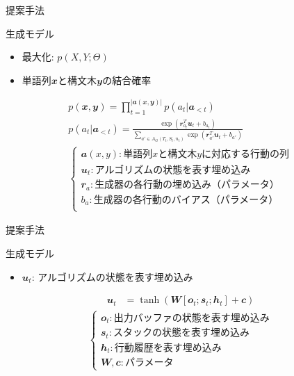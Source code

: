 \documentclass[aspectratio=43,unicode,10pt]{beamer}
\newcommand{\mb}{\mathbfit}
\begin{document}
\begin{frame}{提案手法}
  \begin{block}{生成モデル}
    \begin{itemize}
      \item 最大化: $p(X, Y; \Theta)$
      \item 単語列$\mb{x}$と構文木$\mb{y}$の結合確率
    \end{itemize}
    \begin{gather*}
      p(\mb{x}, \mb{y}) = \prod_{t=1}^{|\mb{a}(\mb{x}, \mb{y})|}
                          p(a_t | \mb{a}_{<t}) \\
      p(a_t | \mb{a}_{<t})
      = \frac{\exp (\mb{r}_{a_t}^T \mb{u}_t + b_{a_t})}
        {\sum_{a' \in A_G(T_t, S_t, n_t)}
         \exp (\mb{r}_{a'}^T \mb{u}_t + b_{a'})} \\
      \begin{cases}
        \mb{a}(x, y): \text{単語列$x$と構文木$y$に対応する行動の列} \\
        \mb{u}_t: \text{アルゴリズムの状態を表す埋め込み} \\
        \mb{r}_a: \text{生成器の各行動の埋め込み（パラメータ）} \\
        b_a: \text{生成器の各行動のバイアス（パラメータ）} \\
      \end{cases}
    \end{gather*}
  \end{block}
\end{frame}

\begin{frame}{提案手法}
  \begin{block}{生成モデル}
    \begin{itemize}
      \item $\mb{u}_t$: アルゴリズムの状態を表す埋め込み
    \end{itemize}
    \begin{align*}
      \mb{u}_t & = \tanh (\mb{W}[\mb{o}_t; \mb{s}_t; \mb{h}_t] + \mb{c})
    \end{align*}
    \begin{gather*}
      \begin{cases}
        \mb{o}_t: \text{出力バッファの状態を表す埋め込み} \\
        \mb{s}_t: \text{スタックの状態を表す埋め込み} \\
        \mb{h}_t: \text{行動履歴を表す埋め込み} \\
        \mb{W}, \mb{c}: \text{パラメータ}
      \end{cases}
    \end{gather*}
  \end{block}
\end{frame}
\end{document}
